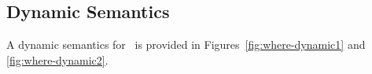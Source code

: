 %
%
%
%

\subsection{Dynamic Semantics}\label{where-dynamic}
A dynamic semantics for \wherecore\ is provided in
Figures~\ref{fig:where-dynamic1} and \ref{fig:where-dynamic2}.

